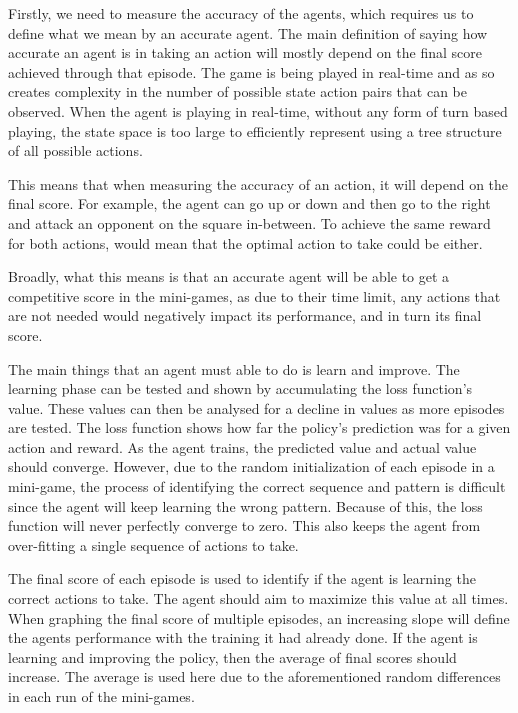 Firstly, we need to measure the accuracy of the agents, which requires us to
define what we mean by an accurate agent. The main definition of saying how
accurate an agent is in taking an action will mostly depend on the final score
achieved through that episode. The game is being played in real-time and as so
creates complexity in the number of possible state action pairs that can be
observed. When the agent is playing in real-time, without any form of turn
based playing, the state space is too large to efficiently represent using a
tree structure of all possible actions.

This means that when measuring the accuracy of an action, it will depend on the
final score. For example, the agent can go up or down and then go to the right
and attack an opponent on the square in-between. To achieve the same reward for
both actions, would mean that the optimal action to take could be either.

Broadly, what this means is that an accurate agent will be able to get a
competitive score in the mini-games, as due to their time limit, any actions
that are not needed would negatively impact its performance, and in turn its
final score.

The main things that an agent must able to do is learn and improve. The learning
phase can be tested and shown by accumulating the loss function's value. These
values can then be analysed for a decline in values as more episodes are tested.
The loss function shows how far the policy's prediction was for a given action
and reward. As the agent trains, the predicted value and actual value should
converge. However, due to the random initialization of each episode in a
mini-game, the process of identifying the correct sequence and pattern is
difficult since the agent will keep learning the wrong pattern. Because of this,
the loss function will never perfectly converge to zero. This also keeps the
agent from over-fitting a single sequence of actions to take.

The final score of each episode is used to identify if the agent is learning the
correct actions to take. The agent should aim to maximize this value at all
times. When graphing the final score of multiple episodes, an increasing slope
will define the agents performance with the training it had already done. If the
agent is learning and improving the policy, then the average of final scores
should increase. The average is used here due to the aforementioned random
differences in each run of the mini-games.

